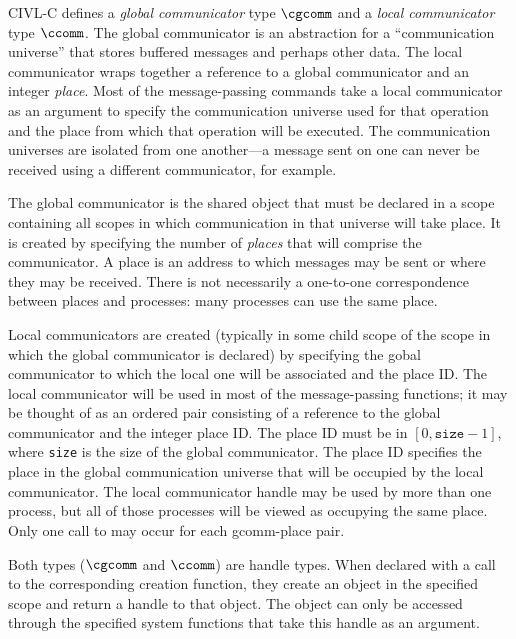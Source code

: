 CIVL-C defines a \emph{global communicator} type $\cgcomm$ and a
\emph{local communicator} type $\ccomm$. The global communicator is an
abstraction for a ``communication universe'' that stores buffered
messages and perhaps other data.  The local communicator wraps
together a reference to a global communicator and an integer
\emph{place}.  Most of the message-passing commands take a local
communicator as an argument to specify the communication universe used
for that operation and the place from which that operation will be
executed.  The communication universes are isolated from one
another---a message sent on one can never be received using a
different communicator, for example.

The global communicator is the shared object that must be declared in
a scope containing all scopes in which communication in that universe
will take place. It is created by specifying the number of
\emph{places} that will comprise the communicator. A place is an
address to which messages may be sent or where they may be received.
There is not necessarily a one-to-one correspondence between places and
processes: many processes can use the same place.

Local communicators are created (typically in some child scope of the
scope in which the global communicator is declared) by specifying the
gobal communicator to which the local one will be associated and the
place ID. The local communicator will be used in most of the
message-passing functions; it may be thought of as an ordered pair
consisting of a reference to the global communicator and the integer
place ID.  The place ID must be in $[0,\texttt{size}-1]$, where
\texttt{size} is the size of the global communicator.  The place ID
specifies the place in the global communication universe that will be
occupied by the local communicator.  The local communicator handle may
be used by more than one process, but all of those processes will be
viewed as occupying the same place.  Only one call to \ccommcreate{}
may occur for each gcomm-place pair.


Both types ($\cgcomm$ and $\ccomm$) are handle types. When declared
with a call to the corresponding creation function, they create an
object in the specified scope and return a handle to that object. The
object can only be accessed through the specified system functions
that take this handle as an argument.


